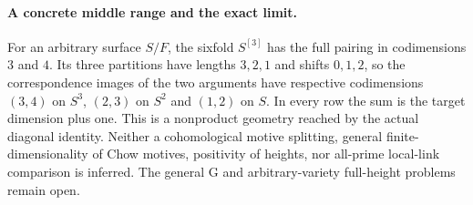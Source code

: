 \paragraph{A concrete middle range and the exact limit.}
For an arbitrary surface $S/F$, the sixfold $S^{[3]}$ has
the full pairing in codimensions $3$ and $4$.  Its three
partitions have lengths $3,2,1$ and shifts $0,1,2$, so the
correspondence images of the two arguments have respective
codimensions $(3,4)$ on $S^3$, $(2,3)$ on $S^2$ and $(1,2)$
on $S$.  In every row the sum is the target dimension plus
one.  This is a nonproduct geometry reached by the actual
diagonal identity.  Neither a cohomological motive splitting,
general finite-dimensionality of Chow motives, positivity
of heights, nor all-prime local-link comparison is inferred.
The general G and arbitrary-variety full-height problems
remain open.
